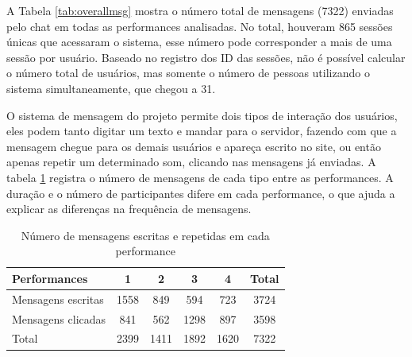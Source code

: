 A Tabela \ref{tab:overallmsg} mostra o número total de mensagens (7322) enviadas pelo chat em todas as performances analisadas. No total, houveram 865 sessões únicas que acessaram o sistema, esse número pode corresponder a mais de uma sessão por usuário. Baseado no registro dos ID das sessões, não é possível calcular o número total de usuários, mas somente o número de pessoas utilizando o sistema simultaneamente, que chegou a 31.


O sistema de mensagem do projeto permite dois tipos de interação dos usuários, eles podem tanto digitar um texto e mandar para o servidor, fazendo com que a mensagem chegue para os demais usuários e apareça escrito no site, ou então apenas repetir um determinado som, clicando nas mensagens já enviadas. A tabela \ref{tab:msgtype} registra o número de mensagens de cada tipo entre as performances. A duração e o número de participantes difere em cada performance, o que ajuda a explicar as diferenças na frequência de mensagens.


\begin{table}[ht!]
\caption{Número de mensagens escritas e repetidas em cada performance}{%
\begin{tabular}{@{}lccccc@{}}
\hline
Performances        & 1 & 2 & 3 & 4 & Total \\
\hline
Mensagens escritas &    1558&   849  &  594  &  723 & 3724 \\
Mensagens clicadas &    841 &   562  &  1298 &  897 & 3598 \\
Total &             2399&   1411 &  1892 & 1620 & 7322 \\
\end{tabular}}
\label{tab:msgtype}
\end{table}


